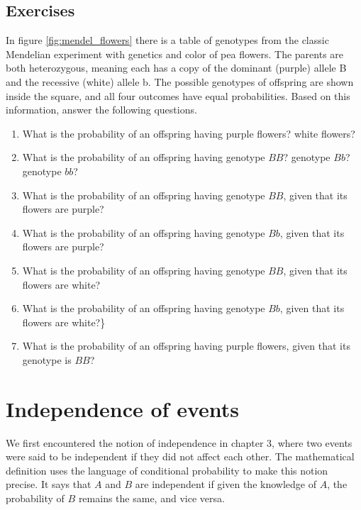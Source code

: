 \documentclass[
  letterpaper,
  DIV=11,
  numbers=noendperiod]{scrreprt}
\begin{document}
\hypertarget{exercises-26}{%
\subsection{Exercises}\label{exercises-26}}

In figure \ref{fig:mendel_flowers} there is a table of genotypes from
the classic Mendelian experiment with genetics and color of pea flowers.
The parents are both heterozygous, meaning each has a copy of the
dominant (purple) allele B and the recessive (white) allele b. The
possible genotypes of offspring are shown inside the square, and all
four outcomes have equal probabilities. Based on this information,
answer the following questions.

\begin{enumerate}
\def\labelenumi{\arabic{enumi}.}
\item
  What is the probability of an offspring having purple flowers? white
  flowers?
\item
  What is the probability of an offspring having genotype \(BB\)?
  genotype \(Bb\)? genotype \(bb\)?
\item
  What is the probability of an offspring having genotype \(BB\), given
  that its flowers are purple?
\item
  What is the probability of an offspring having genotype \(Bb\), given
  that its flowers are purple?
\item
  What is the probability of an offspring having genotype \(BB\), given
  that its flowers are white?
\item
  What is the probability of an offspring having genotype \(Bb\), given
  that its flowers are white?\}
\item
  What is the probability of an offspring having purple flowers, given
  that its genotype is \(BB\)?
\end{enumerate}

\hypertarget{independence-of-events}{%
\section{Independence of events}\label{independence-of-events}}

We first encountered the notion of independence in chapter 3, where two
events were said to be independent if they did not affect each other.
The mathematical definition uses the language of conditional probability
to make this notion precise. It says that \(A\) and \(B\) are
independent if given the knowledge of \(A\), the probability of \(B\)
remains the same, and vice versa.
\end{document}
